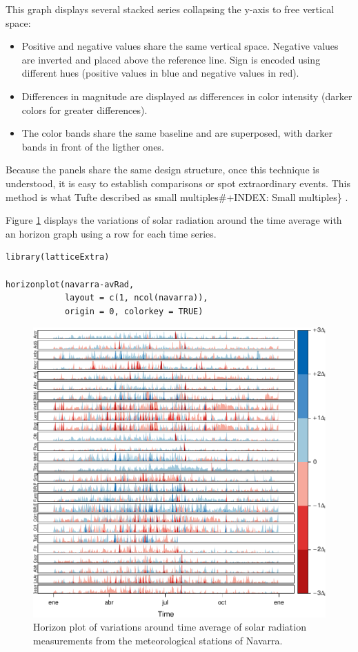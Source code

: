 \documentclass[smallroyalvopaper]{memoir}
\begin{document}
This graph displays several stacked series collapsing the y-axis
to free vertical space:
\begin{itemize}
\item Positive and negative values share the same vertical
space. Negative values are inverted and placed above the
reference line. Sign is encoded using different hues (positive
values in blue and negative values in red).
\item Differences in magnitude are displayed as differences in color
intensity (darker colors for greater differences).
\item The color bands share the same baseline and are superposed, with
darker bands in front of the ligther ones.
\end{itemize}

Because the panels share the same design structure, once this
technique is understood, it is easy to establish comparisons or spot
extraordinary events.  This method is what Tufte described as small
multiples\#+INDEX: Small multiples\} \cite{Tufte1990}.

Figure \ref{fig:navarraHorizonplot} displays the variations of
solar radiation around the time average with an horizon graph
using a row for each time series.


\lstset{language=r,label= ,caption= ,captionpos=b,numbers=none}
\begin{lstlisting}
library(latticeExtra)
  
horizonplot(navarra-avRad,
            layout = c(1, ncol(navarra)),
            origin = 0, colorkey = TRUE)
\end{lstlisting}

\begin{figure}[htbp]
\centering
\includegraphics[width=.9\linewidth]{figs/navarraHorizonplot.pdf}
\caption{Horizon plot of variations around time average of solar radiation measurements from the meteorological stations of Navarra. \label{fig:navarraHorizonplot}}
\end{figure}
\end{document}
